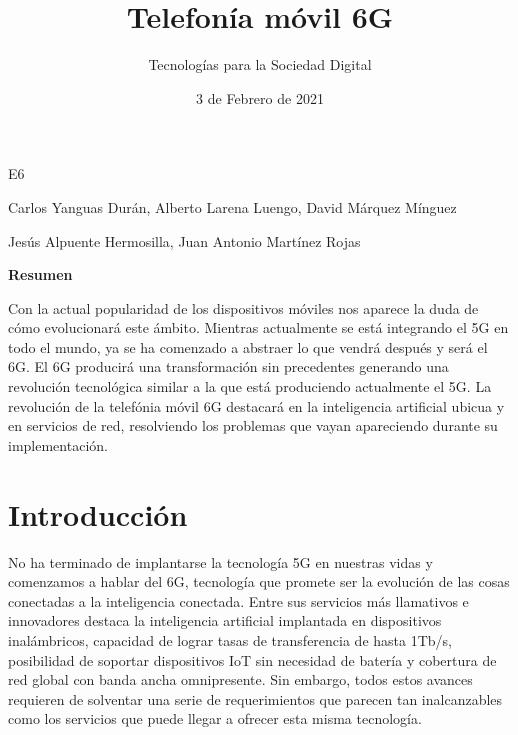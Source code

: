  

 

\graphicspath{{../Book/figures/}}


\title{Telefonía móvil 6G}
\date{3 de Febrero de 2021}            
\author{Tecnologías para la Sociedad Digital}




\maketitle
\begin{description}                             
  {        
  \item[Título en inglés:] \mybooktitleenglish   
  }                                            
  {                                           
  }                                              
\item[Equipo:] E6   
\item[Autores:] Carlos Yanguas Durán, Alberto Larena Luengo, David Márquez Mínguez                
\item[\expandafter\makefirstuc\expandafter{\mybookTutorOrTutores}:] Jesús Alpuente Hermosilla, Juan Antonio Martínez Rojas          
\end{description}   

\begin{center}
 {\bfseries \Large Resumen}
\end{center}
Con la actual popularidad de los dispositivos móviles nos aparece la duda de cómo evolucionará este ámbito. Mientras actualmente se está integrando el 5G en todo el mundo, ya se ha comenzado a abstraer lo que vendrá después y será el 6G. El 6G producirá una transformación sin precedentes generando una revolución tecnológica similar a la que está produciendo actualmente el 5G. La revolución de la telefónia móvil 6G destacará en la inteligencia artificial ubicua y en servicios de red, resolviendo los problemas que vayan apareciendo durante su implementación.                            

\section{Introducción}
\label{sec:introduccion}

No ha terminado de implantarse la tecnología 5G en nuestras  vidas y comenzamos a hablar del 6G, tecnología que promete ser la evolución de las cosas conectadas a la inteligencia conectada. Entre sus servicios más llamativos e innovadores destaca la inteligencia artificial implantada en dispositivos inalámbricos, capacidad de lograr tasas de transferencia de hasta 1Tb/s, posibilidad de soportar dispositivos IoT sin necesidad de batería y cobertura de red global con banda ancha omnipresente. Sin embargo, todos estos avances requieren de solventar una serie de requerimientos que parecen tan inalcanzables como los servicios que puede llegar a ofrecer esta misma tecnología. 

